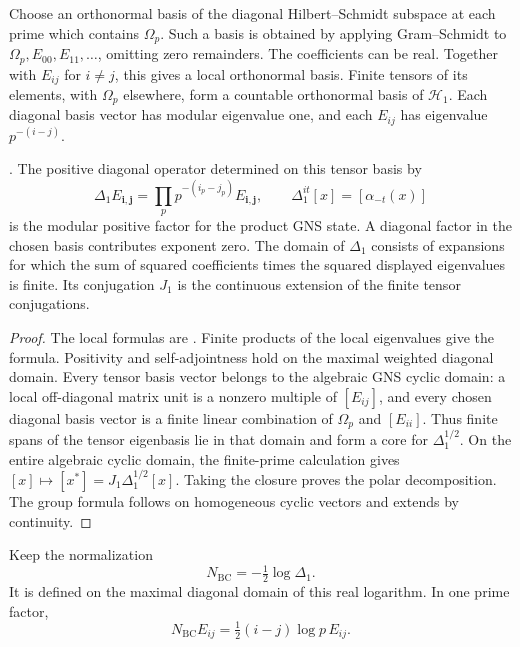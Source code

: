 Choose an orthonormal basis of the diagonal Hilbert--Schmidt
subspace at each prime which contains $\Omega_p$. Such a basis
is obtained by applying Gram--Schmidt to
$\Omega_p,E_{00},E_{11},\ldots$, omitting zero remainders.
The coefficients can be real. Together with $E_{ij}$ for
$i\ne j$, this gives a local orthonormal basis. Finite tensors
of its elements, with $\Omega_p$ elsewhere, form a countable
orthonormal basis of $\mathcal H_1$. Each diagonal basis vector
has modular eigenvalue one, and each $E_{ij}$ has eigenvalue
$p^{-(i-j)}$.

\begin{lemma}
\label{v4-arith:w5-b:lem:modular}
\ClaimStatusProvedHere. The positive diagonal operator determined
on this tensor basis by
\begin{equation}
 \Delta_1E_{\mathbf i,\mathbf j}
    =\prod_p p^{-(i_p-j_p)}E_{\mathbf i,\mathbf j},
 \qquad \Delta_1^{it}[x]=[\alpha_{-t}(x)]
 \label{v4-arith:w5-b:eq:Delta-basis}
\end{equation}
is the modular positive factor for the product GNS state.
A diagonal factor in the chosen basis contributes exponent zero.
The domain of $\Delta_1$ consists of expansions for which the
sum of squared coefficients times the squared displayed
eigenvalues is finite. Its conjugation $J_1$ is the continuous
extension of the finite tensor conjugations.
\end{lemma}

\begin{proof}
The local formulas are . Finite
products of the local eigenvalues give the formula. Positivity
and self-adjointness hold on the maximal weighted diagonal
domain. Every tensor basis vector belongs to the algebraic GNS
cyclic domain: a local off-diagonal matrix unit is a nonzero
multiple of $[E_{ij}]$, and every chosen diagonal basis vector
is a finite linear combination of $\Omega_p$ and $[E_{ii}]$.
Thus finite spans of the tensor eigenbasis lie in that domain
and form a core for $\Delta_1^{1/2}$. On the entire algebraic
cyclic domain, the finite-prime calculation gives
$[x]\mapsto[x^*]=J_1\Delta_1^{1/2}[x]$. Taking the closure
proves the polar decomposition. The group formula follows on
homogeneous cyclic vectors and extends by continuity.
\end{proof}

\begin{definition}
\label{v4-arith:w5-b:def:N-BC}
Keep the normalization
\[
 N_{\mathrm{BC}}=-\tfrac12\log\Delta_1.
\]
It is defined on the maximal diagonal domain of this real
logarithm. In one prime factor,
\begin{equation}
 N_{\mathrm{BC}}E_{ij}=\tfrac12(i-j)\log p\,E_{ij}.
 \label{v4-arith:w5-b:eq:N-BC}
\end{equation}
\end{definition}

